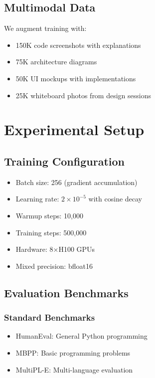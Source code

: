 \documentclass[11pt,a4paper]{article}
\begin{document}
\subsection{Multimodal Data}
We augment training with:
\begin{itemize}
    \item 150K code screenshots with explanations
    \item 75K architecture diagrams
    \item 50K UI mockups with implementations
    \item 25K whiteboard photos from design sessions
\end{itemize}

\section{Experimental Setup}

\subsection{Training Configuration}
\begin{itemize}
    \item Batch size: 256 (gradient accumulation)
    \item Learning rate: $2 \times 10^{-5}$ with cosine decay
    \item Warmup steps: 10,000
    \item Training steps: 500,000
    \item Hardware: 8×H100 GPUs
    \item Mixed precision: bfloat16
\end{itemize}

\subsection{Evaluation Benchmarks}

\subsubsection{Standard Benchmarks}
\begin{itemize}
    \item HumanEval: General Python programming
    \item MBPP: Basic programming problems
    \item MultiPL-E: Multi-language evaluation
\end{itemize}
\end{document}
